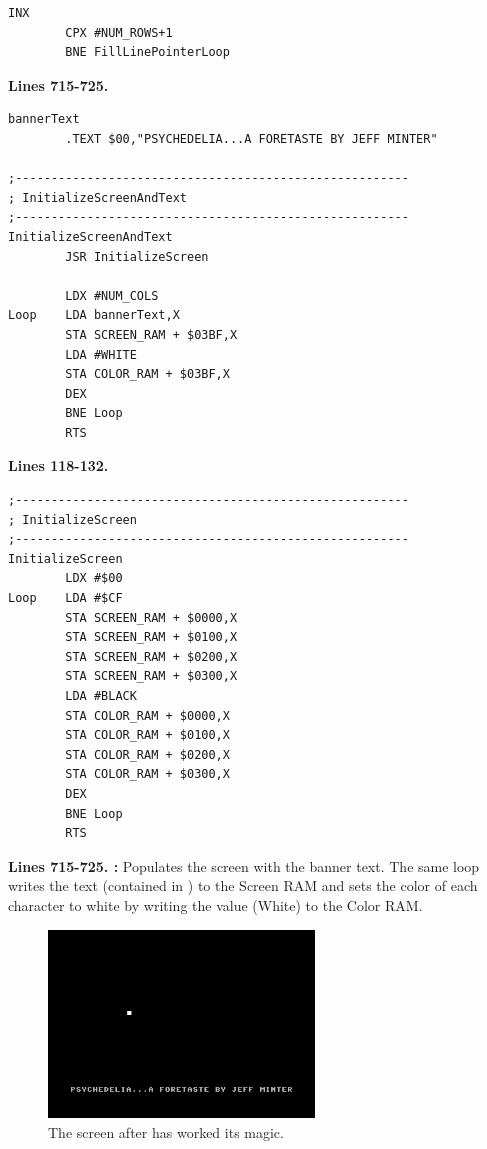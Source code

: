 \begin{lstlisting}[escapechar=\%]
        INX 
        CPX #NUM_ROWS+1
        BNE FillLinePointerLoop
\end{lstlisting}
%

\clearpage
\textbf{Lines 715-725. }
\begin{lstlisting}[caption = A routine that fills the screen with black and the title text.,escapechar=\%]
bannerText   
        .TEXT $00,"PSYCHEDELIA...A FORETASTE BY JEFF MINTER"

;-------------------------------------------------------
; InitializeScreenAndText
;-------------------------------------------------------
InitializeScreenAndText   
        JSR InitializeScreen

        LDX #NUM_COLS
Loop    LDA bannerText,X
        STA SCREEN_RAM + $03BF,X
        LDA #WHITE
        STA COLOR_RAM + $03BF,X
        DEX 
        BNE Loop
        RTS 
\end{lstlisting}

\bigskip
\bigskip
\bigskip
\bigskip
\bigskip
\textbf{Lines 118-132. }
\begin{lstlisting}[caption = Fills the screen with black,escapechar=\%]
;-------------------------------------------------------
; InitializeScreen
;-------------------------------------------------------
InitializeScreen   
        LDX #$00
Loop    LDA #$CF
        STA SCREEN_RAM + $0000,X
        STA SCREEN_RAM + $0100,X
        STA SCREEN_RAM + $0200,X
        STA SCREEN_RAM + $0300,X
        LDA #BLACK
        STA COLOR_RAM + $0000,X
        STA COLOR_RAM + $0100,X
        STA COLOR_RAM + $0200,X
        STA COLOR_RAM + $0300,X
        DEX 
        BNE Loop
        RTS 

\end{lstlisting}
\clearpage

\textbf{Lines 715-725. :} Populates the screen with the banner text. The same loop writes
the text (contained in ) to the Screen RAM and sets the color of each character to white by writing the
value  (White) to the Color RAM.

\begin{figure}[H]
    \centering
      \includegraphics[height=5cm]{src/listing_commentary/foretaste.png}
  \caption*{The screen after  has worked its magic.}
\end{figure}

